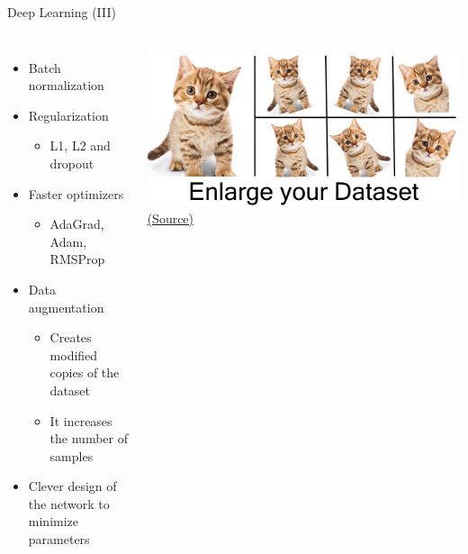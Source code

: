 \documentclass[10pt,compress]{beamer} %
\begin{document}
\begin{frame}{Deep Learning (III)}
    \begin{columns}
		\begin{itemize}
		\item Batch normalization
		\item Regularization
			\begin{itemize}
				\item L1, L2 and \alert{dropout}
			\end{itemize}
		\item Faster optimizers
			\begin{itemize}
				\item AdaGrad, Adam, RMSProp
			\end{itemize}
		\item \alert{Data augmentation} 
			\begin{itemize}
				\item Creates modified copies of the dataset
				\item It increases the number of samples
			\end{itemize}
        	\item Clever design of the network to minimize parameters
	\end{itemize}

	    	\centering \includegraphics[width=\linewidth]{figs/augmentation.png}\\
	    \scriptsize\href{https://medium.com/nanonets/how-to-use-deep-learning-when-you-have-limited-data-part-2-data-augmentation-c26971dc8ced}{(Source)}\\
    \end{columns}
\end{frame}
\end{document}

